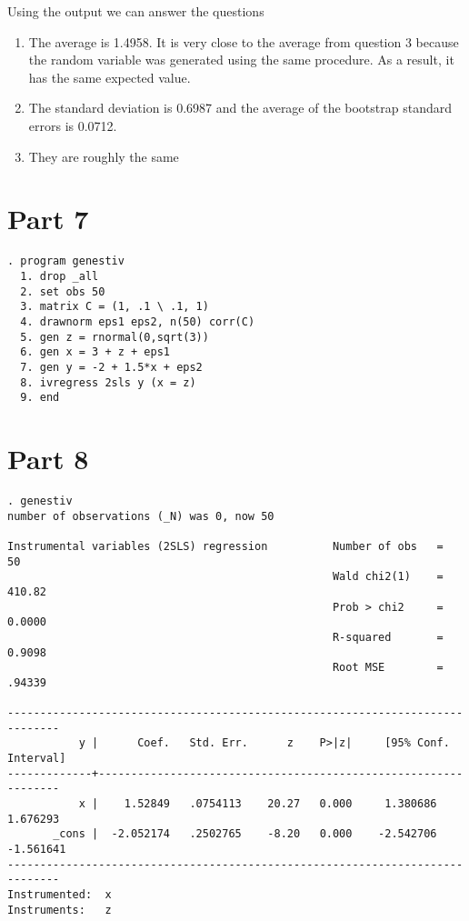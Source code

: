 \documentclass{article}
\begin{document}
Using the output we can answer the questions

\begin{enumerate}[label=(\alph*)]
\item The average is 1.4958. It is very close to the average from question 3 because the random variable was generated using the same procedure. As a result, it has the same expected value.
\item The standard deviation is 0.6987 and the average of the bootstrap standard errors is 0.0712.
\item They are roughly the same
\end{enumerate}

\section{Part 7}
\begin{lstlisting}
. program genestiv
  1. drop _all
  2. set obs 50
  3. matrix C = (1, .1 \ .1, 1)
  4. drawnorm eps1 eps2, n(50) corr(C)
  5. gen z = rnormal(0,sqrt(3))
  6. gen x = 3 + z + eps1
  7. gen y = -2 + 1.5*x + eps2
  8. ivregress 2sls y (x = z)
  9. end

\end{lstlisting}

\section{Part 8}
\begin{lstlisting}
. genestiv
number of observations (_N) was 0, now 50

Instrumental variables (2SLS) regression          Number of obs   =         50
                                                  Wald chi2(1)    =     410.82
                                                  Prob > chi2     =     0.0000
                                                  R-squared       =     0.9098
                                                  Root MSE        =     .94339

------------------------------------------------------------------------------
           y |      Coef.   Std. Err.      z    P>|z|     [95% Conf. Interval]
-------------+----------------------------------------------------------------
           x |    1.52849   .0754113    20.27   0.000     1.380686    1.676293
       _cons |  -2.052174   .2502765    -8.20   0.000    -2.542706   -1.561641
------------------------------------------------------------------------------
Instrumented:  x
Instruments:   z

\end{lstlisting}
\end{document}
